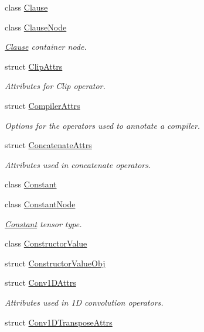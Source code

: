 \begin{DoxyCompactItemize}
class \hyperlink{classtvm_1_1relay_1_1Clause}{Clause}
\item 
class \hyperlink{classtvm_1_1relay_1_1ClauseNode}{Clause\+Node}
\begin{DoxyCompactList}\small\item\em \hyperlink{classtvm_1_1relay_1_1Clause}{Clause} container node. \end{DoxyCompactList}\item 
struct \hyperlink{structtvm_1_1relay_1_1ClipAttrs}{Clip\+Attrs}
\begin{DoxyCompactList}\small\item\em Attributes for Clip operator. \end{DoxyCompactList}\item 
struct \hyperlink{structtvm_1_1relay_1_1CompilerAttrs}{Compiler\+Attrs}
\begin{DoxyCompactList}\small\item\em Options for the operators used to annotate a compiler. \end{DoxyCompactList}\item 
struct \hyperlink{structtvm_1_1relay_1_1ConcatenateAttrs}{Concatenate\+Attrs}
\begin{DoxyCompactList}\small\item\em Attributes used in concatenate operators. \end{DoxyCompactList}\item 
class \hyperlink{classtvm_1_1relay_1_1Constant}{Constant}
\item 
class \hyperlink{classtvm_1_1relay_1_1ConstantNode}{Constant\+Node}
\begin{DoxyCompactList}\small\item\em \hyperlink{classtvm_1_1relay_1_1Constant}{Constant} tensor type. \end{DoxyCompactList}\item 
class \hyperlink{classtvm_1_1relay_1_1ConstructorValue}{Constructor\+Value}
\item 
struct \hyperlink{structtvm_1_1relay_1_1ConstructorValueObj}{Constructor\+Value\+Obj}
\item 
struct \hyperlink{structtvm_1_1relay_1_1Conv1DAttrs}{Conv1\+D\+Attrs}
\begin{DoxyCompactList}\small\item\em Attributes used in 1D convolution operators. \end{DoxyCompactList}\item 
struct \hyperlink{structtvm_1_1relay_1_1Conv1DTransposeAttrs}{Conv1\+D\+Transpose\+Attrs}

\end{DoxyCompactItemize}
